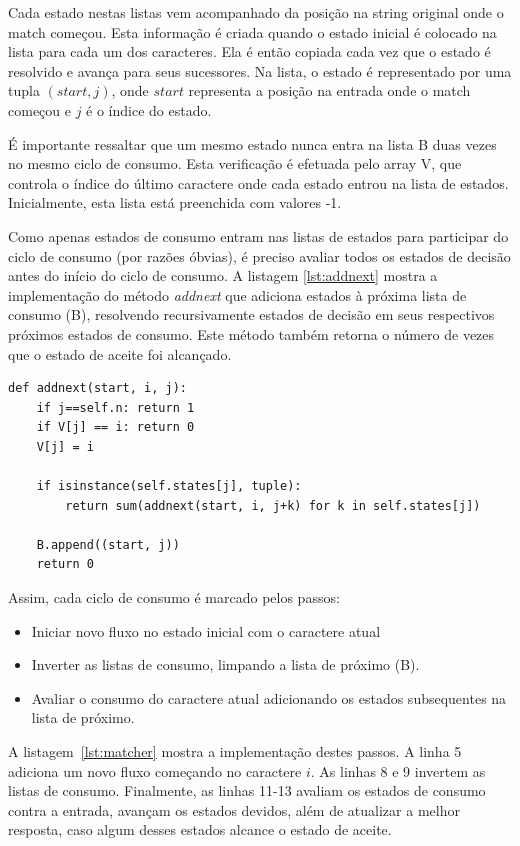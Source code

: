 \documentclass[a4paper,12pt,oneside,onecolumn]{uerj}
\begin{document}
Cada estado nestas listas vem acompanhado da posição na string original onde o match começou. Esta informação é criada quando o estado inicial é colocado na lista para cada um dos caracteres. Ela é então copiada cada vez que o estado é resolvido e avança para seus sucessores. Na lista, o estado é representado por uma tupla $(start, j)$, onde $start$ representa a posição na entrada onde o match começou e $j$ é o índice do estado.

É importante ressaltar que um mesmo estado nunca entra na lista B duas vezes no mesmo ciclo de consumo. Esta verificação é efetuada pelo array V, que controla o índice do último caractere onde cada estado entrou na lista de estados. Inicialmente, esta lista está preenchida com valores -1.

Como apenas estados de consumo entram nas listas de estados para participar do ciclo de consumo (por razões óbvias), é preciso avaliar todos os estados de decisão antes do início do ciclo de consumo. A listagem \ref{lst:addnext} mostra a implementação do método \emph{addnext} que adiciona estados à próxima lista de consumo (B), resolvendo recursivamente estados de decisão em seus respectivos próximos estados de consumo. Este método também retorna o número de vezes que o estado de aceite foi alcançado.

\vspace{0.5cm}
\begin{lstlisting}[caption={Implementação do método \emph{addnext}},label=lst:addnext]
def addnext(start, i, j):
    if j==self.n: return 1
    if V[j] == i: return 0
    V[j] = i

    if isinstance(self.states[j], tuple):
        return sum(addnext(start, i, j+k) for k in self.states[j])

    B.append((start, j))
    return 0
\end{lstlisting}

Assim, cada ciclo de consumo é marcado pelos passos:

\begin{itemize}
    \item Iniciar novo fluxo no estado inicial com o caractere atual
    \item Inverter as listas de consumo, limpando a lista de próximo (B).
    \item Avaliar o consumo do caractere atual adicionando os estados subsequentes na lista de próximo.
\end{itemize}

A listagem~\ref{lst:matcher} mostra a implementação destes passos. A linha 5 adiciona um novo fluxo começando no caractere $i$. As linhas 8 e 9 invertem as listas de consumo. Finalmente, as linhas 11-13 avaliam os estados de consumo contra a entrada, avançam os estados devidos, além de atualizar a melhor resposta, caso algum desses estados alcance o estado de aceite.
\end{document}
